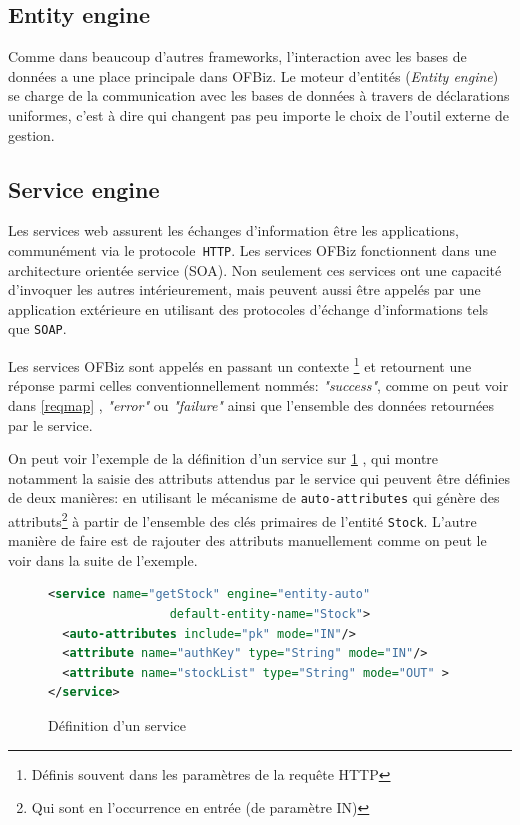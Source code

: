 \subsection{Entity engine}
Comme dans beaucoup d'autres frameworks, l'interaction avec les bases de données a une place principale dans OFBiz. Le moteur d'entités (\emph{Entity engine}) se charge de la communication avec les bases de données à travers de déclarations uniformes, c'est à dire qui changent pas peu importe le choix de l'outil externe de gestion.



\subsection{Service engine}
Les services web assurent les échanges d'information être les applications, communément via le protocole\verb| HTTP|.   
Les services OFBiz fonctionnent dans une architecture orientée service (SOA). Non seulement ces services ont une capacité d'invoquer les autres intérieurement, mais peuvent aussi être appelés par une application extérieure en utilisant des protocoles d'échange d'informations tels que \verb|SOAP|. 

Les services OFBiz sont appelés en passant un contexte \footnote{Définis souvent dans les paramètres de la requête HTTP } et retournent une réponse parmi celles conventionnellement nommés: \emph{"success"}, comme on peut voir dans  \ref{reqmap} , \emph{"error"} ou \emph{"failure"} ainsi que l'ensemble des données retournées par le service. 

On peut voir l'exemple de la définition d'un service sur \ref{servicedef} , qui montre notamment la saisie des attributs attendus par le service qui peuvent être définies de deux manières: en utilisant le mécanisme de \verb|auto-attributes| qui génère des attributs\footnote{Qui sont en l'occurrence en entrée (de paramètre IN)} à partir de l'ensemble des clés primaires de l'entité \verb|Stock|. L'autre manière de faire est de rajouter des attributs manuellement comme on peut le voir dans la suite de l'exemple. 

\begin{figure}
\begin{lstlisting}[frame=leftline,language=XML]
<service name="getStock" engine="entity-auto"
				 default-entity-name="Stock">
  <auto-attributes include="pk" mode="IN"/>
  <attribute name="authKey" type="String" mode="IN"/>
  <attribute name="stockList" type="String" mode="OUT" >
</service>
\end{lstlisting}
\caption{Définition d'un service}
\label{servicedef}
\end{figure}
\newpage

